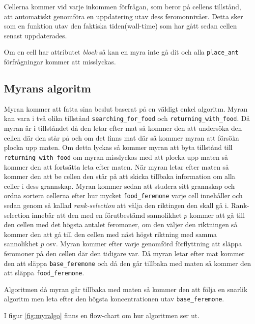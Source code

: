 Cellerna kommer vid varje inkommen förfrågan, som beror på cellens tillstånd, att automatiskt genomföra en uppdatering utav dess feromonnivåer. Detta sker som en funktion utav den faktiska tiden(wall-time) som har gått sedan cellen senast uppdaterades.

Om en cell har attributet  \emph{block} så kan en myra inte gå dit och alla \verb+place_ant+ förfrågningar kommer att misslyckas.

\subsection{Myrans algoritm}

Myran kommer att fatta sina beslut baserat på en väldigt enkel algoritm. Myran kan vara i två olika tillstånd \verb+searching_for_food+ och \verb+returning_with_food+. Då myran är i tillståndet då den letar efter mat så kommer den att undersöka den cellen där den står på och om det finns mat där så kommer myran att försöka plocka upp maten. Om detta lyckas så kommer myran att byta tillstånd till \verb+returning_with_food+ om myran misslyckas med att plocka upp maten så kommer den att fortsätta leta efter maten. När myran letar efter maten så kommer den att be cellen den står på att skicka tillbaka information om alla celler i dess grannskap. Myran kommer sedan att studera sitt grannskap och ordna sortera cellerna efter hur mycket \verb+food_feremone+ varje cell innehåller och sedan genom så kallad \emph{rank-selection} att välja den riktingen den skall gå i. Rank-selection innebär att den med en förutbestämd sannolikhet $p$ kommer att gå till den cellen med det högsta antalet feromoner, om den väljer den riktningen så kommer den att gå till den cellen med näst högst riktning med samma sannolikhet $p$ osv. Myran kommer efter varje genomförd förflyttning att släppa feromoner på den cellen där den tidigare var. Då myran letar efter mat kommer den att släppa \verb+base_feremone+ och då den går tillbaka med maten så kommer den att släppa \verb+food_feremone+.

Algoritmen då myran går tillbaka med maten så kommer den att följa en snarlik algoritm men leta efter den högsta koncentrationen utav \verb+base_feremone+.

I figur \ref{fig:myralgo} finns en flow-chart om hur algoritmen ser ut.


